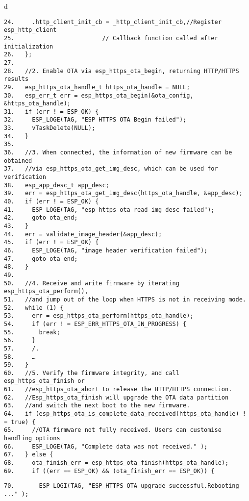 \documentclass[a4paper,12pt]{book}
\begin{document}
\begin{codebloc}
\begin{tabular}{d}
\vspace{2pt}
\begin{verbatim}
24.     .http_client_init_cb = _http_client_init_cb,//Register esp_http_client
25.                         // Callback function called after initialization
26.   };
27.
28.   //2. Enable OTA via esp_https_ota_begin, returning HTTP/HTTPS results
29.   esp_https_ota_handle_t https_ota_handle = NULL;
30.   esp_err_t err = esp_https_ota_begin(&ota_config, &https_ota_handle);
31.   if (err ! = ESP_OK) {
32.     ESP_LOGE(TAG, "ESP HTTPS OTA Begin failed");
33.     vTaskDelete(NULL);
34.   }
35.
36.   //3. When connected, the information of new firmware can be obtained
37.   //via esp_https_ota_get_img_desc, which can be used for verification
38.   esp_app_desc_t app_desc;
39.   err = esp_https_ota_get_img_desc(https_ota_handle, &app_desc);
40.   if (err ! = ESP_OK) {
41.     ESP_LOGE(TAG, "esp_https_ota_read_img_desc failed");
42.     goto ota_end;
43.   }
44.   err = validate_image_header(&app_desc);
45.   if (err ! = ESP_OK) {
46.     ESP_LOGE(TAG, "image header verification failed");
47.     goto ota_end;
48.   }
49.
50.   //4. Receive and write firmware by iterating esp_https_ota_perform(),
51.   //and jump out of the loop when HTTPS is not in receiving mode.
52.   while (1) {
53.     err = esp_https_ota_perform(https_ota_handle);
54.     if (err ! = ESP_ERR_HTTPS_OTA_IN_PROGRESS) {
55.       break;
56.     }
57.     /.
58.     …
59.   }
60.   //5. Verify the firmware integrity, and call esp_https_ota_finish or
61.   //esp_https_ota_abort to release the HTTP/HTTPS connection.
62.   //Esp_https_ota_finish will upgrade the OTA data partition
63.   //and switch the next boot to the new firmware.
64.   if (esp_https_ota_is_complete_data_received(https_ota_handle) ! = true) {
65.     //OTA firmware not fully received. Users can customise handling options
66.     ESP_LOGE(TAG, "Complete data was not received." );
67.   } else {
68.     ota_finish_err = esp_https_ota_finish(https_ota_handle);
69.     if ((err == ESP_OK) && (ota_finish_err == ESP_OK)) {
\end{verbatim}
\verb|70.       ESP_LOGI(TAG, "ESP_HTTPS_OTA upgrade successful.Rebooting ..." );|
\end{tabular}
\end{codebloc}
\end{document}
